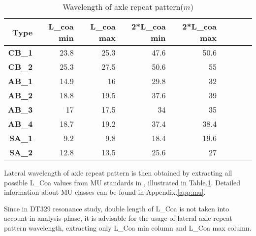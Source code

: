 \begin{table}[h!]
  \centering
  \caption{Wavelength of axle repeat pattern($m$)}
    \begin{tabular}{rrrrrrrrr}
    \toprule
    \textbf{Type} & \textbf{L\_coa min} & \textbf{L\_coa max} & \textbf{2*L\_coa min } & \textbf{2*L\_coa max} \\
    \midrule
    \textbf{CB\_1} & 23.8  & 25.3  & 47.6  & 50.6 \\
    \textbf{CB\_2} & 25.3  & 27.5  & 50.6  & 55    \\
    \textbf{AB\_1} & 14.9  & 16    & 29.8  & 32     \\
    \textbf{AB\_2} & 18.8  & 19.5  & 37.6  & 39    \\
    \textbf{AB\_3} & 17    & 17.5  & 34    & 35   \\
    \textbf{AB\_4} & 18.7  & 19.2  & 37.4  & 38.4  \\
    \textbf{SA\_1} & 9.2   & 9.8   & 18.4  & 19.6  \\
    \textbf{SA\_2} & 12.8  & 13.5  & 25.6  & 27    \\

    \bottomrule
    \end{tabular}%
  \label{tab:wavelengthaxlerepeat}%
\end{table}%

Lateral wavelength of axle repeat pattern is then obtained by extracting all possible L\_Coa values from MU standards in \cite{EC15528}, illustrated in Table.\ref{tab:wavelengthaxlerepeat}. Detailed information about MU classes can be found in Appendix.\ref{app:mu}.

Since in DT329 resonance study, double length of L\_Coa is not taken into account in analysis phase, it is advisable for the usage of lateral axle repeat pattern wavelength, extracting only L\_Coa min column and L\_Coa max column.


